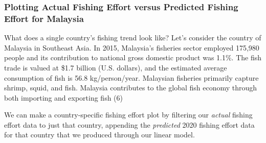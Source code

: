 \documentclass[
]{article}
\begin{document}
\hypertarget{plotting-actual-fishing-effort-versus-predicted-fishing-effort-for-malaysia}{%
\subsubsection{Plotting Actual Fishing Effort versus Predicted Fishing
Effort for
Malaysia}\label{plotting-actual-fishing-effort-versus-predicted-fishing-effort-for-malaysia}}

What does a single country's fishing trend look like? Let's consider the
country of Malaysia in Southeast Asia. In 2015, Malaysia's fisheries
sector employed 175,980 people and its contribution to national gross
domestic product was 1.1\%. The fish trade is valued at \$1.7 billion
(U.S. dollars), and the estimated average consumption of fish is 56.8
kg/person/year. Malaysian fisheries primarily capture shrimp, squid, and
fish. Malaysia contributes to the global fish economy through both
importing and exporting fish (6)

We can make a country-specific fishing effort plot by filtering our
\emph{actual} fishing effort data to just that country, appending the
\emph{predicted} 2020 fishing effort data for that country that we
produced through our linear model.
\end{document}

